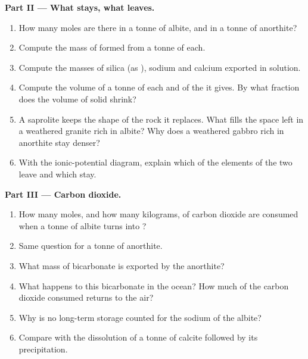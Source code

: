 \begin{problem}
\medskip
\noindent\textbf{Part II --- What stays, what leaves.}
\begin{enumerate}[resume]
  \item How many moles are there in a tonne of albite, and in a tonne of
        anorthite?
  \item Compute the mass of  formed from a tonne of each.
  \item Compute the masses of silica (as ), sodium and calcium
        exported in solution.
  \item Compute the volume of a tonne of each  and of the  it
        gives. By what fraction does the volume of solid shrink?
  \item A saprolite keeps the shape of the rock it replaces. What fills the
        space left in a weathered granite rich in albite? Why does a weathered
        gabbro rich in anorthite stay denser?
  \item With the ionic-potential diagram, explain which of the elements of
        the two  leave and which stay.
\end{enumerate}

\medskip
\noindent\textbf{Part III --- Carbon dioxide.}
\begin{enumerate}[resume]
  \item How many moles, and how many kilograms, of carbon dioxide are consumed
        when a tonne of albite turns into ?
  \item Same question for a tonne of anorthite.
  \item What mass of bicarbonate is exported by the anorthite?
  \item What happens to this bicarbonate in the ocean? How much of the carbon
        dioxide consumed returns to the air?
  \item Why is no long-term storage counted for the sodium of the albite?
  \item Compare with the dissolution of a tonne of calcite followed by its
        precipitation.
\end{enumerate}


\end{problem}
